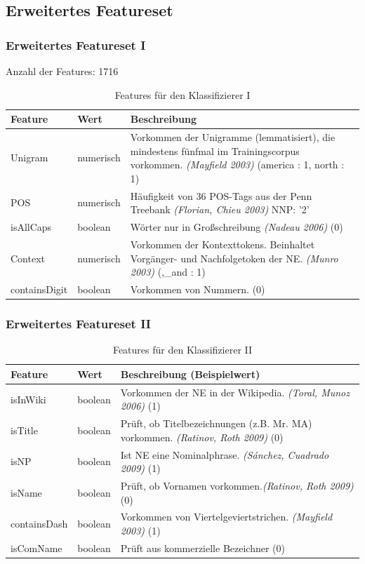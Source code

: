 \documentclass{beamer}
\begin{document}
	\subsection{Erweitertes Featureset}
	\begin{frame}
		\frametitle{Erweitertes Featureset I}
		Anzahl der Features: 1716
 			\begin{table}
 				\caption{Features für den Klassifizierer I}
 				\begin{tabularx}{\textwidth}{llX}
 					\toprule
 					Feature & Wert & Beschreibung\\
 					\midrule
 					Unigram & numerisch & Vorkommen der Unigramme (lemmatisiert), die mindestens fünfmal im Trainingscorpus vorkommen. \textit{(Mayfield 2003)} \color{red}(america : 1, north : 1)\\
 					POS & numerisch  & Häufigkeit von 36 POS-Tags aus der Penn Treebank \textit{(Florian, Chieu 2003)} \color{red}NNP: '2'\\
 					isAllCaps & boolean & Wörter nur in Großschreibung \textit{(Nadeau 2006)} \color{red} (0)\\
 					Context & numerisch & Vorkommen der Kontexttokens. Beinhaltet Vorgänger- und Nachfolgetoken der NE. \textit{(Munro 2003)}  \color{red} (,\_and : 1)\\
 					containsDigit & boolean & Vorkommen von Nummern. \color{red} (0)\textit{}\\
 					\bottomrule
 				\end{tabularx}
 				\label{tab:allf1}
 			\end{table}
 	\end{frame}
 		\begin{frame}
 			\frametitle{Erweitertes Featureset II}
 					\begin{table}
 						\caption{Features für den  Klassifizierer II}
 						\begin{tabularx}{\textwidth}{llX}
 							\toprule
 							Feature & Wert & Beschreibung (Beispielwert)\\
 							\midrule
 							isInWiki & boolean & Vorkommen der NE in der Wikipedia. \textit{(Toral, Munoz 2006)} \color{red} (1)\\
 							isTitle & boolean & Prüft, ob Titelbezeichnungen (z.B. Mr. MA) vorkommen. \textit{(Ratinov, Roth 2009)} (0)\\
 							isNP & boolean & Ist NE eine Nominalphrase. \textit{(Sánchez, Cuadrado 2009)} \color{red} (1)\\
 							isName & boolean & Prüft, ob Vornamen vorkommen.\textit{(Ratinov, Roth 2009)} (0)\\
 							containsDash & boolean & Vorkommen von Viertelgeviertstrichen. \textit{(Mayfield 2003)} (1) \\
 							isComName & boolean & Prüft aus kommerzielle Bezeichner \color{red} (0)\\
 							\bottomrule
 						\end{tabularx}
 						\label{tab:allf2}
 					\end{table}
 		\end{frame}
\end{document}
